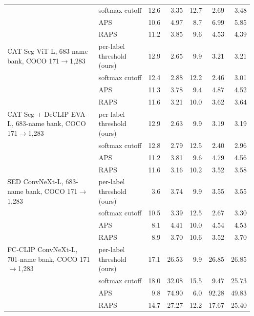 \begin{tabular}{@{}llrrrrr@{}}
 & softmax cutoff & 12.6 & 3.35 & 12.7 & 2.69 & 3.48 \\
 & APS & 10.6 & 4.97 & 8.7 & 6.99 & 5.85 \\
 & RAPS & 11.2 & 3.85 & 9.6 & 4.53 & 4.39 \\
\midrule
CAT-Seg ViT-L, 683-name bank, COCO 171$\to$1,283 & per-label threshold (ours) & 12.9 & 2.65 & 9.9 & 3.21 & 3.21 \\
 & softmax cutoff & 12.4 & 2.88 & 12.2 & 2.46 & 3.01 \\
 & APS & 11.3 & 3.78 & 9.4 & 4.87 & 4.52 \\
 & RAPS & 11.6 & 3.21 & 10.0 & 3.62 & 3.64 \\
\midrule
CAT-Seg + DeCLIP EVA-L, 683-name bank, COCO 171$\to$1,283 & per-label threshold (ours) & 12.9 & 2.63 & 9.9 & 3.19 & 3.19 \\
 & softmax cutoff & 12.8 & 2.79 & 12.5 & 2.40 & 2.96 \\
 & APS & 11.2 & 3.81 & 9.6 & 4.79 & 4.56 \\
 & RAPS & 11.6 & 3.16 & 10.2 & 3.52 & 3.58 \\
\midrule
SED ConvNeXt-L, 683-name bank, COCO 171$\to$1,283 & per-label threshold (ours) & 3.6 & 3.74 & 9.9 & 3.55 & 3.55 \\
 & softmax cutoff & 10.5 & 3.39 & 12.5 & 2.67 & 3.30 \\
 & APS & 8.1 & 4.41 & 10.0 & 4.54 & 4.53 \\
 & RAPS & 8.9 & 3.70 & 10.6 & 3.52 & 3.70 \\
\midrule
FC-CLIP ConvNeXt-L, 701-name bank, COCO 171$\to$1,283 & per-label threshold (ours) & 17.1 & 26.53 & 9.9 & 26.85 & 26.85 \\
 & softmax cutoff & 18.0 & 32.08 & 15.5 & 9.47 & 25.73 \\
 & APS & 9.8 & 74.90 & 6.0 & 92.28 & 49.83 \\
 & RAPS & 14.7 & 27.27 & 12.2 & 17.67 & 25.40 \\
\bottomrule
\end{tabular}
